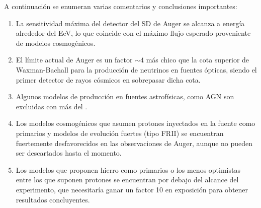 	A continuaci\'on se enumeran varias comentarios y conclusiones importantes:
	\begin{enumerate}
	 \item La sensitividad m\'axima del detector del SD de Auger se alcanza a energ\'ia alrededor del EeV, lo que coincide con el m\'aximo flujo esperado proveniente de modelos cosmog\'enicos.
	 \item El l\'imite actual de Auger es un factor $\sim4$ m\'as chico que la cota superior de Waxman-Bachall para la producci\'on de neutrinos en fuentes \'opticas, siendo el primer detector de rayos c\'osmicos en sobrepasar dicha cota.
	 \item Algunos modelos de producci\'on en fuentes astrof\'isicas, como AGN son excluidas con m\'as del .
	 \item Los modelos cosmog\'enicos que asumen protones inyectados en la fuente como primarios y modelos de evoluci\'on fuertes (tipo FRII) se encuentran fuertemente desfavorecidos en las observaciones de Auger, aunque no pueden ser descartados hasta el momento.
	 \item Los modelos que proponen hierro como primarios o los menos optimistas entre los que suponen protones se encuentran por debajo del alcance del experimento, que necesitar\'ia ganar un factor 10 en exposici\'on para obtener resultados concluyentes.
	\end{enumerate}
	
